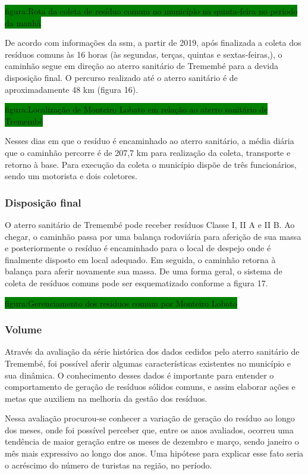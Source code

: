 	\colorbox{green}{figura:Rota da coleta de resíduo comum no município na quinta-feira no período da manhã}
	
	De acordo com informações da \gls{ssm}, a partir de 2019, após finalizada a coleta dos resíduos comuns às 16 horas (às segundas, terças, quintas e sextas-feiras,), o caminhão segue em direção ao aterro sanitário de Tremembé para a devida disposição final. O percurso realizado até o aterro sanitário é de aproximadamente 48 km (figura 16).
	
	\colorbox{green}{figura:Localização de Monteiro Lobato em relação ao aterro sanitário de Tremembé}
	
	Nesses dias em que o resíduo é encaminhado ao aterro sanitário, a média diária que o caminhão percorre é de 207,7 km para realização da coleta, transporte e retorno à base. Para execução da coleta o município dispõe de três funcionários, sendo um motorista e dois coletores.
	
	\subsubsection{Disposição final}
	
	O aterro sanitário de Tremembé pode receber resíduos Classe I, II A e II B. Ao chegar, o caminhão passa por uma balança rodoviária para aferição de sua massa e posteriormente o resíduo é encaminhado para o local de despejo onde é finalmente disposto em local adequado. Em seguida, o caminhão retorna à balança para aferir novamente sua massa.
	De uma forma geral, o sistema de coleta de resíduos comuns pode ser esquematizado conforme a figura 17.
	
	\colorbox{green}{figura:Gerenciamento dos resíduos comum por Monteiro Lobato}
	
	\subsubsection{Volume}
	
	Através da avaliação da série histórica dos dados cedidos pelo aterro sanitário de Tremembé, foi possível aferir algumas características existentes no município e sua dinâmica. O conhecimento desses dados é importante para entender o comportamento de geração de resíduos sólidos comuns, e assim elaborar ações e metas que auxiliem na melhoria da gestão dos resíduos.
	
	Nessa avaliação procurou-se conhecer a variação de geração do resíduo ao longo dos meses, onde foi possível perceber que, entre os anos avaliados, ocorreu uma tendência de maior geração entre os meses de dezembro e março, sendo janeiro o mês mais expressivo ao longo dos anos. Uma hipótese para explicar esse fato seria o acréscimo do número de turistas na região, no período.
	
